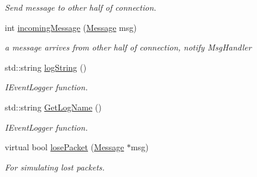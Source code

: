 \begin{DoxyCompactItemize}
\begin{DoxyCompactList}\small\item\em Send message to other half of connection. \item\end{DoxyCompactList}\item 
\hypertarget{classPseudoTcp_1_1Connection_a56fd24c36d1715f1a19134457a0397d2}{
int \hyperlink{classPseudoTcp_1_1Connection_a56fd24c36d1715f1a19134457a0397d2}{incomingMessage} (\hyperlink{classPseudoTcp_1_1Message}{Message} msg)}
\label{classPseudoTcp_1_1Connection_a56fd24c36d1715f1a19134457a0397d2}

\begin{DoxyCompactList}\small\item\em a message arrives from other half of connection, notify MsgHandler \item\end{DoxyCompactList}\item 
\hypertarget{classPseudoTcp_1_1Connection_ace88510ecc921611cde9e56c07c65a35}{
std::string \hyperlink{classPseudoTcp_1_1Connection_ace88510ecc921611cde9e56c07c65a35}{logString} ()}
\label{classPseudoTcp_1_1Connection_ace88510ecc921611cde9e56c07c65a35}

\begin{DoxyCompactList}\small\item\em IEventLogger function. \item\end{DoxyCompactList}\item 
\hypertarget{classPseudoTcp_1_1Connection_ab1ceffdba79e19f1fc25eff2b79d05b3}{
std::string \hyperlink{classPseudoTcp_1_1Connection_ab1ceffdba79e19f1fc25eff2b79d05b3}{GetLogName} ()}
\label{classPseudoTcp_1_1Connection_ab1ceffdba79e19f1fc25eff2b79d05b3}

\begin{DoxyCompactList}\small\item\em IEventLogger function. \item\end{DoxyCompactList}\item 
virtual bool \hyperlink{classPseudoTcp_1_1Connection_aaa3f50be412caa3c5970fd5ca3d930c0}{losePacket} (\hyperlink{classPseudoTcp_1_1Message}{Message} $\ast$msg)
\begin{DoxyCompactList}\small\item\em For simulating lost packets. \item\end{DoxyCompactList}\end{DoxyCompactItemize}
